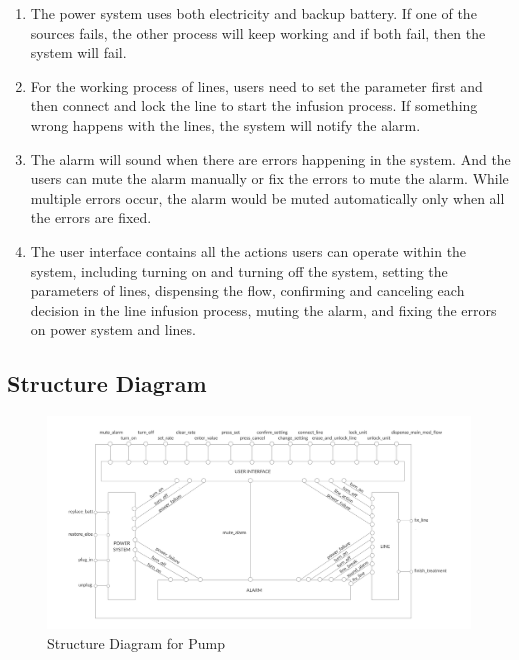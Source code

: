 \documentclass[titlepage]{article}
\begin{document}
        \begin{enumerate}
            \item The power system uses both electricity and backup battery. If one of the sources fails, the other process will keep working and if both fail, then the system will fail.
            \item For the working process of lines, users need to set the parameter first and then connect and lock the line to start the infusion process. If something wrong happens with the lines, the system will notify the alarm.
            \item The alarm will sound when there are errors happening in the system. And the users can mute the alarm manually or fix the errors to mute the alarm. While multiple errors occur, the alarm would be muted automatically only when all the errors are fixed.
            \item The user interface contains all the actions users can operate within the system, including turning on and turning off the system, setting the parameters of lines, dispensing the flow, confirming and canceling each decision in the line infusion process, muting the alarm, and fixing the errors on power system and lines.
        \end{enumerate}
   
    \subsection{Structure Diagram}
   
       \begin{figure}[h]
           \includegraphics[width=\linewidth]{graph.jpg}
           \caption{Structure Diagram for Pump}
           \label{fig:diagram}
       \end{figure}
    
\end{document}
